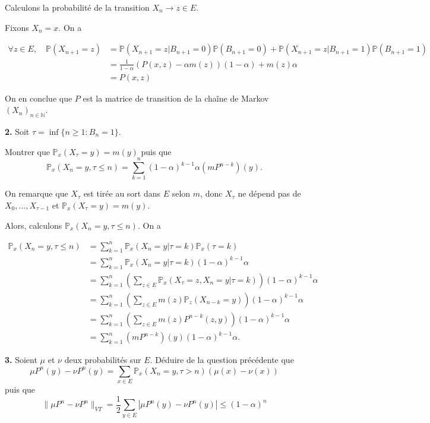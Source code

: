 \documentclass[french]{article}
\begin{document}
	Calculons la probabilité de la transition $X_n \to z \in E$.
	
	Fixons $X_n = x$. On a 

	\begin{align*}
		\forall z \in E, \quad \mathbb{P}(X_{n+1} = z) &= \mathbb{P}(X_{n+1} = z| B_{n+1} = 0)\mathbb{P}(B_{n+1} = 0) + \mathbb{P}(X_{n+1} = z| B_{n+1} = 1)\mathbb{P}(B_{n+1} = 1)\\
		&= \frac{1}{1-\alpha}\left(P(x, z) - \alpha m(z)\right) (1 - \alpha) + m(z)\alpha\\
		&= P(x, z)
	\end{align*}
	
	On en conclue que $P$ est la matrice de transition de la chaîne de Markov $(X_n)_{n \in \mathbb{N}}$.
	
	
	\begin{tcolorbox}[colback=gray!5!white,colframe=gray!75!black]
		\textbf{2.} Soit $\tau = \inf \{n \geq 1 : B_n = 1\}.$
		
		Montrer que $\mathbb{P}_x(X_\tau = y) = m(y)$ puis que
		$$ \mathbb{P}_x(X_n = y, \tau \leq n) = \sum_{k=1}^{n} (1 - \alpha)^{k-1} \alpha(mP^{n-k})(y).$$
	\end{tcolorbox}

	On remarque que $X_\tau$ est tirée au sort dans $E$ selon $m$, donc $X_\tau$ ne dépend pas de $X_0,...,X_{\tau - 1}$ et $\mathbb{P}_x(X_\tau = y) = m(y)$.
	
	Alors, calculons $\mathbb{P}_x(X_n = y, \tau \leq n)$. On a
	
	\begin{align}
		\mathbb{P}_x(X_n = y, \tau \leq n) &= \sum_{k=1}^{n} \mathbb{P}_x(X_n = y | \tau = k) \mathbb{P}_x(\tau = k)\\
		&= \sum_{k=1}^{n} \mathbb{P}_x(X_n = y | \tau = k)(1 - \alpha)^{k-1} \alpha \\
		&= \sum_{k=1}^{n} \left( \sum_{z \in E} \mathbb{P}_x(X_\tau = z, X_n = y | \tau = k)\right)(1 - \alpha)^{k-1} \alpha \\
		&= \sum_{k=1}^{n} \left( \sum_{z \in E} m(z)\mathbb{P}_{z}(X_{n-k} = y)\right)(1 - \alpha)^{k-1} \alpha \\
		&= \sum_{k=1}^{n} \left( \sum_{z \in E} m(z)P^{n-k}(z, y)\right)(1 - \alpha)^{k-1} \alpha \\
		& = \sum_{k=1}^{n} (mP^{n-k})(y)(1 - \alpha)^{k-1} \alpha.
	\end{align}

	\begin{tcolorbox}[colback=gray!5!white,colframe=gray!75!black]
		\textbf{3.} Soient $\mu$ et $\nu$ deux probabilités sur $E$. Déduire de la question précédente que
		$$ \mu P^n(y) - \nu P^n(y) = \sum_{x \in E} \mathbb{P}_x(X_n = y, \tau > n)(\mu(x) - \nu(x)) $$
		puis que
		$$ \|\mu P^n - \nu P^n\|_{VT} = \frac{1}{2} \sum_{y \in E} |\mu P^n(y) - \nu P^n(y)| \leq (1 - \alpha)^n $$
	\end{tcolorbox}
\end{document}
